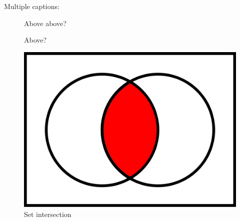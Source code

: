 \documentclass[12pt]{article}
\theoremstyle{plain}
\theoremstyle{definition}
\theoremstyle{remark}
\theoremstyle{mystyle}
\begin{document}
Multiple captions:
\begin{figure}[ht]
\centering
\caption{Above above?}
\caption*{Above?}
\includegraphics[scale=0.25]{AcapB}
\caption[lot]{Set intersection\label{fig:acapb}}
\end{figure}



\end{document}
